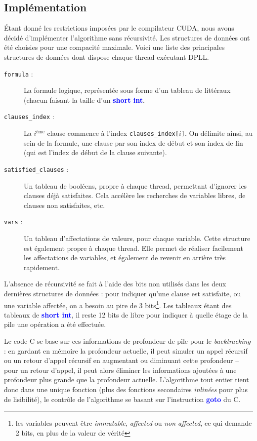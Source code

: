 \documentclass{article}
\newcommand{\keyword}[1]{\textbf{\textcolor{blue}{#1}}}
\newcommand{\code}[1]{\texttt{{#1}}}
\newcommand{\cuda}{\textsc{CUDA}}
\begin{document}
\subsection{Implémentation}
Étant donné les restrictions imposées par le compilateur \cuda, nous avons décidé d'implémenter l'algorithme sans récursivité. Les structures de données ont été choisies pour une compacité maximale. Voici une liste des principales structures de données dont dispose chaque thread exécutant \textsc{DPLL}.
\begin{description}
    \item[\code{formula} :] La formule logique, représentée sous forme d'un tableau de littéraux (chacun faisant la taille d'un \keyword{short int}.
    \item[\code{clauses\_index} :] La $i^{\textrm{ème}}$ clause commence à l'index \code{clauses\_index[$i$]}. On délimite ainsi, au sein de la formule, une clause par son index de début et son index de fin (qui est l'index de début de la clause suivante).
    \item[\code{satisfied\_clauses} :] Un tableau de booléens, propre à chaque thread, permettant d'ignorer les clauses déjà satisfaites. Cela accélère les recherches de variables libres, de clauses non satisfaites, etc.
    \item[\code{vars} :] Un tableau d'affectations de valeurs, pour chaque variable. Cette structure est également propre à chaque thread. Elle permet de réaliser facilement les affectations de variables, et également de revenir en arrière très rapidement.
\end{description}

L'absence de récursivité se fait à l'aide des bits non utilisés dans les deux dernières structures de données : pour indiquer qu'une clause est satisfaite, ou une variable affectée, on a besoin au pire de 3 bits\footnote{les variables peuvent être \emph{immutable}, \emph{affected} ou \emph{non affected}, ce qui demande 2 bits, en plus de la valeur de vérité}. Les tableaux étant des tableaux de \keyword{short int}, il reste 12 bits de libre pour indiquer à quelle étage de la pile une opération a été effectuée.

Le code C se base sur ces informations de profondeur de pile pour le \emph{backtracking} : en gardant en mémoire la profondeur actuelle, il peut simuler un appel récursif ou un retour d'appel récursif en augmentant ou diminuant cette profondeur -- pour un retour d'appel, il peut alors éliminer les informations ajoutées à une profondeur plus grande que la profondeur actuelle. L'algorithme tout entier tient donc dans une unique fonction (plus des fonctions secondaires \emph{inlinées} pour plus de lisibilité), le contrôle de l'algorithme se basant sur l'instruction \keyword{goto} du C.
\end{document}
